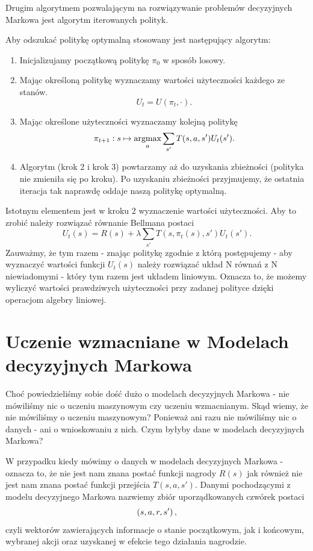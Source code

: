 \documentclass[10pt,a4paper]{book}
\newcommand{\argmax}{\operatornamewithlimits{argmax}}
\begin{document}
Drugim algorytmem pozwalającym na rozwiązywanie problemów decyzyjnych Markowa jest algorytm iterowanych polityk. 

\begin{definition}
Aby odszukać politykę optymalną stosowany jest następujący algorytm:
\begin{enumerate}
\item Inicjalizujamy początkową politykę $\pi_0$ w sposób losowy. 
\item Mając określoną politykę wyznaczamy wartości użyteczności każdego ze stanów.
$$
U_t = U(\pi_t, \cdot).
$$
\item Mając określone użyteczności wyznaczamy kolejną politykę
$$
\pi_{t+1}: s \mapsto \argmax_{a} \sum_{s'} T(s,a,s') U_t(s').
$$
\item Algorytm (krok 2 i krok 3) powtarzamy aż do uzyskania zbieżności (polityka nie zmieniła się po kroku). Po uzyskaniu zbieżności przyjmujemy, że ostatnia iteracja tak naprawdę oddaje naszą politykę optymalną.
\end{enumerate}

Istotnym elementem jest w kroku 2 wyznaczenie wartości użyteczności. Aby to zrobić należy rozwiązać równanie Bellmana postaci
$$
U_t(s) = R(s) + \lambda \sum_{s'} T(s, \pi_t(s), s') U_t(s').
$$
Zauważmy, że tym razem - znając politykę zgodnie z którą postępujemy - aby wyznaczyć wartości funkcji $U_t(s)$ należy rozwiązać układ N równań z N niewiadomymi - który tym razem jest układem liniowym. Oznacza to, że możemy wyliczyć wartości prawdziwych użyteczności przy zadanej polityce dzięki operacjom algebry liniowej.
\end{definition}

\chapter{Uczenie wzmacniane w Modelach decyzyjnych Markowa}

Choć powiedzieliśmy sobie dość dużo o modelach decyzyjnych Markowa - nie mówiliśmy nic o uczeniu maszynowym czy uczeniu wzmacnianym. Skąd wiemy, że nie mówiliśmy o uczeniu maszynowym? Ponieważ ani razu nie mówiliśmy nic o danych - ani o wnioskowaniu z nich. Czym byłyby dane w modelach decyzyjnych Markowa?

\begin{definition}
W przypadku kiedy mówimy o danych w modelach decyzyjnych Markowa - oznacza to, że nie jest nam znana postać funkcji nagrody $R(s)$ jak również nie jest nam znana postać funkcji przejścia $T(s,a,s')$. Danymi pochodzącymi z modelu decyzyjnego Markowa nazwiemy zbiór uporządkowanych czwórek postaci 
$$
\left( {s,a,r,s'} \right),
$$
czyli wektorów zawierających informacje o stanie początkowym, jak i końcowym, wybranej akcji oraz uzyskanej w efekcie tego działania nagrodzie.
\end{definition}
\end{document}
